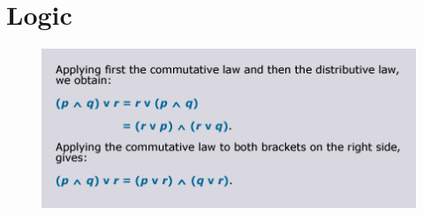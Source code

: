 \documentclass{article}
\begin{document}
\section{Logic}

\begin{figure}
\centering
\includegraphics[width=0.7\linewidth]{./ex311}
\caption{}
\label{fig:ex311}
\end{figure}
\end{document}
